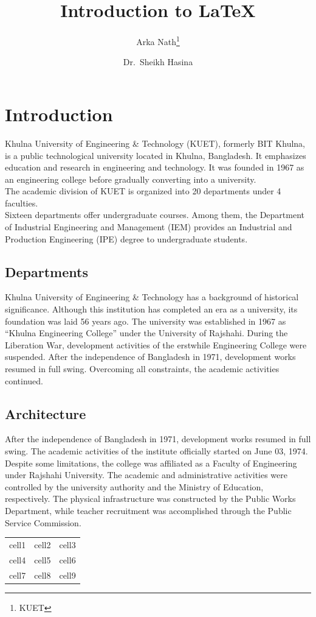 \documentclass[12pt,a4paper]{article}
\title{Introduction to \LaTeX}
\author{Arka Nath\footnote{KUET} \and Dr.\ Sheikh Hasina}
\begin{document}
	
	\maketitle
	\tableofcontents
	
	\section{Introduction}
	
	Khulna University of Engineering \& Technology (KUET), formerly BIT Khulna, 
	is a public technological university located in Khulna, Bangladesh. 
	It emphasizes education and research in engineering and technology. 
	It was founded in 1967 as an engineering college before gradually converting into a university.\\
	
	The academic division of KUET is organized into 20 departments under 4 faculties.\\
	Sixteen departments offer undergraduate courses. Among them, the Department of 
	Industrial Engineering and Management (IEM) provides an Industrial and 
	Production Engineering (IPE) degree to undergraduate students.
	
	\subsection{Departments}
	
	Khulna University of Engineering \& Technology has a background of historical significance. 
	Although this institution has completed an era as a university, its foundation was laid 56 years ago. 
	The university was established in 1967 as ``Khulna Engineering College'' under the University of Rajshahi. 
	During the Liberation War, development activities of the erstwhile Engineering College were suspended. 
	After the independence of Bangladesh in 1971, development works resumed in full swing. 
	Overcoming all constraints, the academic activities continued.
	
	\subsection{Architecture}
	
	After the independence of Bangladesh in 1971, development works resumed in full swing. 
	The academic activities of the institute officially started on June 03, 1974. 
	Despite some limitations, the college was affiliated as a Faculty of Engineering under Rajshahi University. 
	The academic and administrative activities were controlled by the university authority 
	and the Ministry of Education, respectively. 
	The physical infrastructure was constructed by the Public Works Department, while teacher recruitment was accomplished through the Public Service Commission.
	
	\begin{center}
		\begin{tabular}{ c c c }
			cell1 & cell2 & cell3 \\
			cell4 & cell5 & cell6 \\
			cell7 & cell8 & cell9 \\
		\end{tabular}
	\end{center}
	
\end{document}
